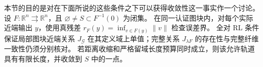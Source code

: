 \documentclass{ctexart}
\begin{document}
本节的目的是对在下面所说的这些条件之下可以获得收敛性这一事实作一个讨论。
设 $F:\mathbb R^n\rightrightarrows\mathbb R^n$，且 $\varnothing\ne S\subset F^{-1}(0)$ 为闭集。
在同一认证图块内，对每个实际近端输出 $y$，使用真残差 $r_F(y)=\inf_{v\in F(y)}\|v\|$ 检查误差界。
全对 RL 条件保证局部图块近端关系 $J_{\mathcal G}$ 在其定义域上单值；完整关系 $J_{\lambda F}$ 的存在性与完整纤维一致性仍须分别核对。
若距离收缩和严格留域长度预算同时成立，则该允许轨道具有有限长度，并收敛到 $S$ 中的一点。
\end{document}
